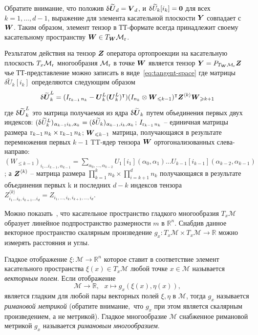 Обратите внимание, что положив $\updelta \widetilde{\boldsymbol{U}}_d = \boldsymbol{V}_d$, и  $\updelta \widetilde{U}_k[i_k] = \boldsymbol{0}$ для всех $k = 1, \ldots, d-1$, выражение для элемента касательной плоскости $\boldsymbol{Y}$ совпадает с $\boldsymbol{W}$. Таким образом, элемент тензор в ТТ-формате всегда принадлежит своему касательному пространству $\boldsymbol{W} \in T_{\boldsymbol{W}} \mathcal{M}_{\operatorname{r}}$.

Резльтатом действия на тензор $\boldsymbol{Z}$ оператора ортопроекции на касательную плоскость $T_x \mathcal{M}_{\operatorname{r}}$ многообразия $\mathcal{M}_{\operatorname{r}}$ в точке $\boldsymbol{W}$ является тензор $\boldsymbol{Y} = P_{T_{\boldsymbol{W}} \mathcal{M}_{\operatorname{r}}} \boldsymbol{Z}$ чье ТТ-представление можно записать в виде~\eqref{eq:tangent-space} где матрицы $\delta \widetilde{U}_k[i_k]$ определяются следующим образом~\cite{lubich2015time}
\[
\updelta \widetilde{\boldsymbol{U}}_k^L = (I_{\operatorname{r}_{k-1}n_k} - \boldsymbol{U}^L_k (\boldsymbol{U}^L_k)^\intercal) (I_{n_k} \otimes \boldsymbol{W}_{\leqslant k-1})^\intercal \boldsymbol{Z}^{\langle k \rangle} \boldsymbol{W}_{\geqslant k+1}
\]
где $\updelta \widetilde{\boldsymbol{U}}_k^L$ это матрица получаемая из ядра $\updelta \widetilde{\boldsymbol{U}}_k$ путем объединения первых двух индексов: $(\updelta \widetilde{U}_k^L)_{\upalpha_{k-1} i_k, \upalpha_k} = (\updelta \widetilde{U}_k)_{\upalpha_{k-1}, i_k, \upalpha_k}$; $I_{\operatorname{r}_{k-1}n_k}$ -- единичная матрицы размера $\operatorname{r}_{k-1}n_k \times \operatorname{r}_{k-1}n_k$; $\boldsymbol{W}_{\leqslant k-1}$ матрица, получающаяся в результате перемножения первых $k-1$ TT-ядер тензора $\boldsymbol{W}$ ортогонализованных слева-направо: $(W_{\leq k-1})_{i_1 \ldots i_{k-1}, \alpha_{k-1}} = \sum_{\alpha_0, \ldots, \alpha_{k-2}} U_1[i_1](\alpha_0, \alpha_1) \ldots U_{k-1}[i_{k-1}](\alpha_{k-2}, \alpha_{k-1})$; а  $\boldsymbol{Z}^{\langle k \rangle}$ -- матрица размера $\prod_{k=1}^k n_k \times \prod_{i=k+1}^d n_k$ получающаяся в результате объединения первых k и последних $d-k$ индексов тензора $Z^{\langle k \rangle}_{i_1 \ldots i_k, i_{k+1} \ldots i_d} = Z_{i_1, \ldots, i_k, i_{k+1}, \ldots, i_d}$.

Можно показать~\cite{RS13, Thm. 1.23}, что касательное пространство гладкого многообразия $T_x \mathcal{M}$ образует линейное подпространство размерности $m$ в $\mathbb{R}^n$. Снабдив данное векторное пространство скалярным произведение $g_x : T_x \mathcal{M} \times T_x \mathcal{M} \to \mathbb{R}$ можно измерять расстояния и углы.

Гладкое отображение $\xi : \mathcal{M} \to \mathbb{R}^n$ которое ставит в соответствие элемент касательного пространства $\xi(x) \in T_x \mathcal{M}$ любой точке $x \in \mathcal{M}$ называется \emph{векторным полем}. Если отображение
\[
\mathcal{M} \to \mathbb{R}, ~~~ x \mapsto g_x(\xi(x), \eta(x)),
\]
является гладким для любой пары векторных полей $\xi, \eta$ в $\mathcal{M}$, тогда $g_x$ называется \emph{римановой метрикой} (обратите внимание, что $g_x$ при этом является скалярным произведением, а не метрикой). Гладкое многообразие $\mathcal{M}$ снабженное римановой метрикой $g_x$ называется \emph{римановым многообразием}.

